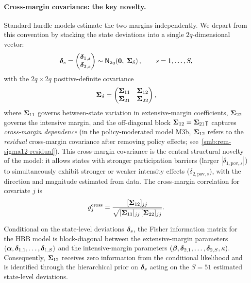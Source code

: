 \paragraph{Cross-margin covariance: the key novelty.}
Standard hurdle models estimate the two margins independently. We depart from
this convention by stacking the state deviations into a single $2q$-dimensional
vector:
\begin{equation}\label{eq:delta-stack}
  \boldsymbol{\delta}_s
  = \begin{pmatrix} \boldsymbol{\delta}_{1,s} \\ \boldsymbol{\delta}_{2,s} \end{pmatrix}
  \sim \textsf{N}_{2q}\!\left({\mathbf{0},\;\boldsymbol{\Sigma}_\delta}\right),
  \qquad s = 1,\ldots,S,
\end{equation}
with the $2q \times 2q$ positive-definite covariance
\begin{equation}\label{eq:sigma-delta}
  \boldsymbol{\Sigma}_\delta
  = \begin{pmatrix}
      \boldsymbol{\Sigma}_{11} & \boldsymbol{\Sigma}_{12} \\
      \boldsymbol{\Sigma}_{21} & \boldsymbol{\Sigma}_{22}
    \end{pmatrix},
\end{equation}
where $\boldsymbol{\Sigma}_{11}$ governs between-state variation in extensive-margin
coefficients, $\boldsymbol{\Sigma}_{22}$ governs the intensive margin, and the
off-diagonal block $\boldsymbol{\Sigma}_{12} = \boldsymbol{\Sigma}_{21}\intercal$ captures
\emph{cross-margin dependence} (in the policy-moderated model M3b, $\boldsymbol{\Sigma}_{12}$ refers to the \emph{residual} cross-margin covariance after removing policy effects; see~\cref{smb:rem-sigma12-residual}). This cross-margin covariance is the central
structural novelty of the model: it allows states with stronger participation
barriers (larger $|\delta_{1,\mathrm{pov},s}|$) to simultaneously exhibit
stronger or weaker intensity effects ($\delta_{2,\mathrm{pov},s}$), with the
direction and magnitude estimated from data. The cross-margin correlation for
covariate $j$ is
\begin{equation}\label{eq:cross-corr}
  \varrho_j^{\mathrm{cross}} = \frac{[\boldsymbol{\Sigma}_{12}]_{jj}}
  {\sqrt{[\boldsymbol{\Sigma}_{11}]_{jj}\,[\boldsymbol{\Sigma}_{22}]_{jj}}}.
\end{equation}

\begin{proposition}
  \label{prop:sigma12-nonid}
  Conditional on the state-level deviations $\boldsymbol{\delta}_s$, the Fisher
  information matrix for the HBB model is block-diagonal between
  the extensive-margin parameters $(\boldsymbol{\alpha}, \boldsymbol{\delta}_{1,1},\ldots,\boldsymbol{\delta}_{1,S})$
  and the intensive-margin parameters
  $(\boldsymbol{\beta}, \boldsymbol{\delta}_{2,1},\ldots,\boldsymbol{\delta}_{2,S}, \kappa)$. Consequently,
  $\boldsymbol{\Sigma}_{12}$ receives zero information from the conditional
  likelihood and is identified through the hierarchical prior on
  $\boldsymbol{\delta}_s$ acting on the $S = 51$ estimated state-level deviations.
\end{proposition}


